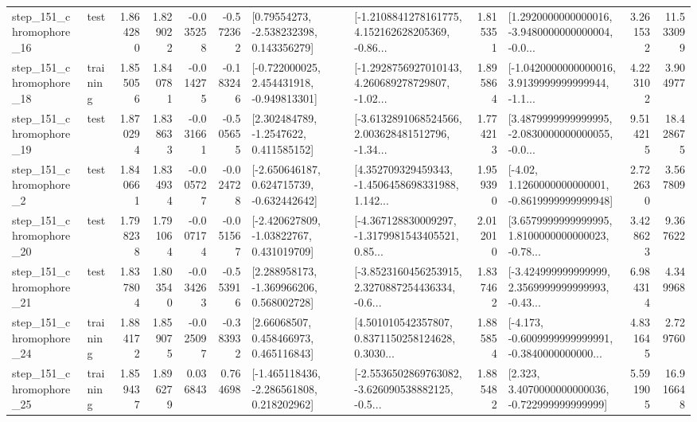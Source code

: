 \begin{tabular}{llrrrrllrlrr}
  step\_151\_chromophore\_16 &      test &      1.864280 &    1.829022 &     -0.035258 & -0.572362 &     [0.79554273, -2.538232398, 0.143356279] &  [-1.2108841278161775, 4.152162628205369, -0.86... &       1.815351 &  [1.2920000000000016, -3.9480000000000004, -0.0... &            3.261532 &         11.533099 \\
  step\_151\_chromophore\_18 &  training &      1.855056 &    1.840781 &     -0.014275 & -0.183246 &   [-0.722000025, 2.454431918, -0.949813301] &  [-1.2928756927010143, 4.260689278729807, -1.02... &       1.895864 &  [-1.0420000000000016, 3.9139999999999944, -1.1... &            4.223102 &          3.904977 \\
  step\_151\_chromophore\_19 &      test &      1.870294 &    1.838633 &     -0.031661 & -0.505655 &      [2.302484789, -1.2547622, 0.411585152] &  [-3.6132891068524566, 2.003628481512796, -1.34... &       1.774213 &  [3.4879999999999995, -2.0830000000000055, -0.0... &            9.514215 &         18.428675 \\
   step\_151\_chromophore\_2 &      test &      1.840661 &    1.834934 &     -0.005727 & -0.024728 &   [-2.650646187, 0.624715739, -0.632442642] &  [4.352709329459343, -1.4506458698331988, 1.142... &       1.959390 &   [-4.02, 1.1260000000000001, -0.8619999999999948] &            2.722630 &          3.567809 \\
  step\_151\_chromophore\_20 &      test &      1.798238 &    1.791064 &     -0.007174 & -0.051567 &    [-2.420627809, -1.03822767, 0.431019709] &  [-4.367128830009297, -1.3179981543405521, 0.85... &       2.012010 &  [3.6579999999999995, 1.8100000000000023, -0.78... &            3.428623 &          9.367622 \\
  step\_151\_chromophore\_21 &      test &      1.837804 &    1.803540 &     -0.034263 & -0.553916 &    [2.288958173, -1.369966206, 0.568002728] &  [-3.8523160456253915, 2.3270887254436334, -0.6... &       1.837462 &  [-3.424999999999999, 2.3569999999999993, -0.43... &            6.984314 &          4.349968 \\
  step\_151\_chromophore\_24 &  training &      1.884172 &    1.859075 &     -0.025097 & -0.383932 &      [2.66068507, 0.458466973, 0.465116843] &  [4.501010542357807, 0.8371150258124628, 0.3030... &       1.885854 &  [-4.173, -0.6009999999999991, -0.3840000000000... &            4.831645 &          2.729760 \\
  step\_151\_chromophore\_25 &  training &      1.859437 &    1.896279 &      0.036843 &  0.764698 &   [-1.465118436, -2.286561808, 0.218202962] &  [-2.5536502869763082, -3.626090538882125, -0.5... &       1.885482 &    [2.323, 3.4070000000000036, -0.722999999999999] &            5.591905 &         16.916648 \\

\end{tabular}
